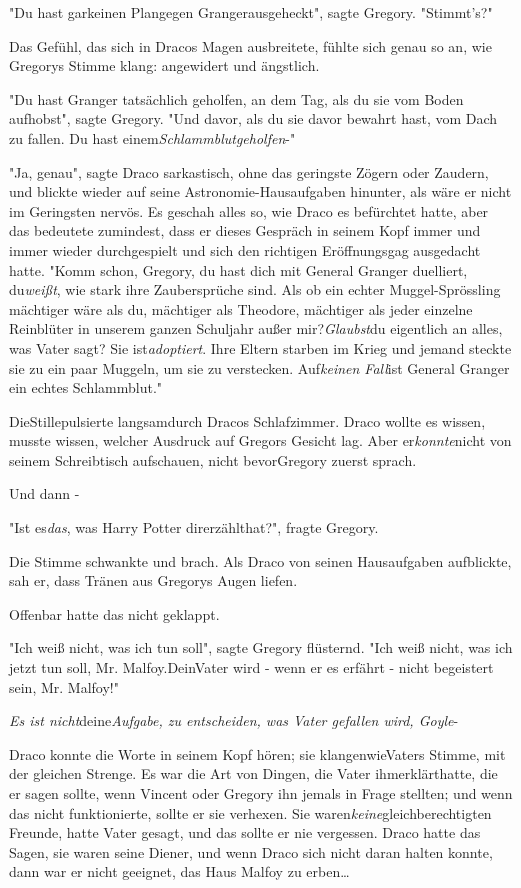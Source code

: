 {"Du hast garkeinen Plangegen Grangerausgeheckt", sagte Gregory. "Stimmt's?"

Das Gefühl, das sich in Dracos Magen ausbreitete, fühlte sich genau so an, wie Gregorys Stimme klang: angewidert und ängstlich.

"Du hast Granger tatsächlich geholfen, an dem Tag, als du sie vom Boden aufhobst", sagte Gregory. "Und davor, als du sie davor bewahrt hast, vom Dach zu fallen. Du hast einem\emph{Schlammblutgeholfen}-"

"Ja, genau", sagte Draco sarkastisch, ohne das geringste Zögern oder Zaudern, und blickte wieder auf seine Astronomie-Hausaufgaben hinunter, als wäre er nicht im Geringsten nervös. Es geschah alles so, wie Draco es befürchtet hatte, aber das bedeutete zumindest, dass er dieses Gespräch in seinem Kopf immer und immer wieder durchgespielt und sich den richtigen Eröffnungsgag ausgedacht hatte. "Komm schon, Gregory, du hast dich mit General Granger duelliert, du\emph{weißt}, wie stark ihre Zaubersprüche sind. Als ob ein echter Muggel-Sprössling mächtiger wäre als du, mächtiger als Theodore, mächtiger als jeder einzelne Reinblüter in unserem ganzen Schuljahr außer mir?\emph{Glaubst}du eigentlich an alles, was Vater sagt? Sie ist\emph{adoptiert}. Ihre Eltern starben im Krieg und jemand steckte sie zu ein paar Muggeln, um sie zu verstecken. Auf\emph{keinen Fall}ist General Granger ein echtes Schlammblut."

DieStillepulsierte langsamdurch Dracos Schlafzimmer. Draco wollte es wissen, musste wissen, welcher Ausdruck auf Gregors Gesicht lag. Aber er\emph{konnte}nicht von seinem Schreibtisch aufschauen, nicht bevorGregory zuerst sprach.

Und dann -

"Ist es\emph{das}, was Harry Potter direrzählthat?", fragte Gregory.

Die Stimme schwankte und brach. Als Draco von seinen Hausaufgaben aufblickte, sah er, dass Tränen aus Gregorys Augen liefen.

Offenbar hatte das nicht geklappt.

"Ich weiß nicht, was ich tun soll", sagte Gregory flüsternd. "Ich weiß nicht, was ich jetzt tun soll, Mr. Malfoy.DeinVater wird - wenn er es erfährt - nicht begeistert sein, Mr. Malfoy!"

\emph{Es ist nicht}deine\emph{Aufgabe, zu entscheiden, was Vater gefallen wird, Goyle}-

Draco konnte die Worte in seinem Kopf hören; sie klangenwieVaters Stimme, mit der gleichen Strenge. Es war die Art von Dingen, die Vater ihmerklärthatte, die er sagen sollte, wenn Vincent oder Gregory ihn jemals in Frage stellten; und wenn das nicht funktionierte, sollte er sie verhexen. Sie waren\emph{keine}gleichberechtigten Freunde, hatte Vater gesagt, und das sollte er nie vergessen. Draco hatte das Sagen, sie waren seine Diener, und wenn Draco sich nicht daran halten konnte, dann war er nicht geeignet, das Haus Malfoy zu erben…

}
